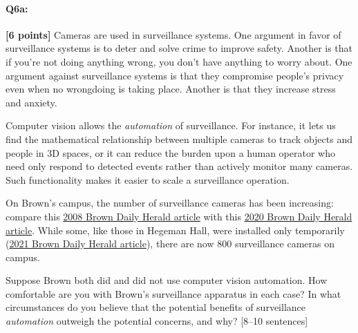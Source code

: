 \pagebreak 
\paragraph{Q6a:} \textbf{[6 points]} Cameras are used in surveillance systems. One argument in favor of surveillance systems is to deter and solve crime to improve safety. Another is that if you're not doing anything wrong, you don't have anything to worry about. One argument against surveillance systems is that they compromise people's privacy even when no wrongdoing is taking place. Another is that they increase stress and anxiety.

Computer vision allows the \emph{automation} of surveillance. For instance, it lets us find the mathematical relationship between multiple cameras to track objects and people in 3D spaces, or it can reduce the burden upon a human operator who need only respond to detected events rather than actively monitor many cameras. Such functionality makes it easier to scale a surveillance operation.

On Brown's campus, the number of surveillance cameras has been increasing: compare this \href{https://www.browndailyherald.com/2008/01/10/surveillance-cameras-on-campus-triple/}{2008 Brown Daily Herald article} with this \href{https://www.browndailyherald.com/2020/02/21/cameras-installed-hegeman-hall/}{2020 Brown Daily Herald article}. While some, like those in Hegeman Hall, were installed only temporarily (\href{https://www.browndailyherald.com/article/2021/07/university-removes-hegeman-hall-surveillance-cameras}{2021 Brown Daily Herald article}), there are now 800 surveillance cameras on campus.

\begin{tcolorbox}[colback=orange!5!white,colframe=orange!75!black]
Suppose Brown both did and did not use computer vision automation. How comfortable are you with Brown's surveillance apparatus in each case?
In what circumstances do you believe that the potential benefits of surveillance \emph{automation} outweigh the potential concerns, and why? [8--10 sentences]
\end{tcolorbox}


